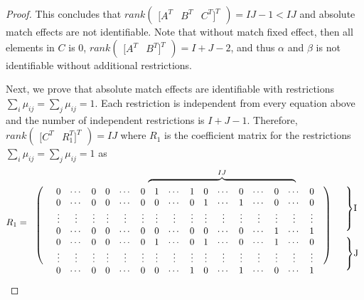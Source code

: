 \documentclass[12pt]{article}
\begin{document}
\begin{proof}
    This concludes that $rank\begin{pmatrix}         [A^T & B^T & C^T]^T     \end{pmatrix}=IJ-1<IJ$ and absolute match effects are not identifiable. 
    Note that without match fixed effect, then all elements in $C$ is $0$, $rank\begin{pmatrix}
        [A^T & B^T]^T
    \end{pmatrix}=I+J-2$, and thus $\alpha$ and $\beta$ is not identifiable without additional restrictions. 
    
    Next, we prove that absolute match effects are identifiable with restrictions $\sum_i\mu_{ij}=\sum_j\mu_{ij}=1$.
    Each restriction is independent from every equation above and the number of independent restrictions is $I+J-1$. 
    Therefore, $rank\begin{pmatrix}
        [C^T & R_1^T]^T
    \end{pmatrix}=IJ$ where $R_1$ is the coefficient matrix for the restrictions $\sum_i\mu_{ij}=\sum_j\mu_{ij}=1$ as
    \begin{equation*}
        R_1 = 
        \begin{array}{rccccccccccccccccll}
            & \multicolumn{16}{l}{\hspace{10em}\overbrace{\hspace{16em}}^{IJ}}&&\\
            \ldelim({7}{14pt}[] & 0 & \cdots & 0 & 0 & \cdots & 0 & 1 & \cdots & 1 & 0 & \cdots & 0 & \cdots & 0 & \cdots & 0 & \rdelim){7}{14pt}[]&\rdelim\}{4}{14pt}[I]\\
            & 0 & \cdots & 0 & 0 & \cdots & 0 & 0 & \cdots & 0 & 1 & \cdots & 1 & \cdots & 0 & \cdots & 0 & & \\
            & \vdots & \vdots & \vdots & \vdots & \vdots & \vdots & \vdots & \vdots & \vdots & \vdots & \vdots & \vdots & \vdots & \vdots & \vdots & \vdots & &\\
             & 0 & \cdots & 0 & 0 & \cdots & 0 & 0 & \cdots & 0 & 0 & \cdots & 0 & \cdots & 1 & \cdots & 1 & &\\
              & 0 & \cdots & 0 & 0 & \cdots & 0 & 1 & \cdots & 0 & 1 & \cdots & 0 & \cdots & 1 & \cdots & 0 & & \rdelim\}{3}{14pt}[J]\\
              & \vdots & \vdots & \vdots & \vdots & \vdots & \vdots & \vdots & \vdots & \vdots & \vdots & \vdots & \vdots & \vdots & \vdots & \vdots & \vdots & &\\
              & 0 & \cdots & 0 & 0 & \cdots & 0 & 0 & \cdots & 1 & 0 & \cdots & 1 & \cdots & 0 & \cdots & 1 & & \\

\end{array}
\end{equation*}
\end{proof}
\end{document}
